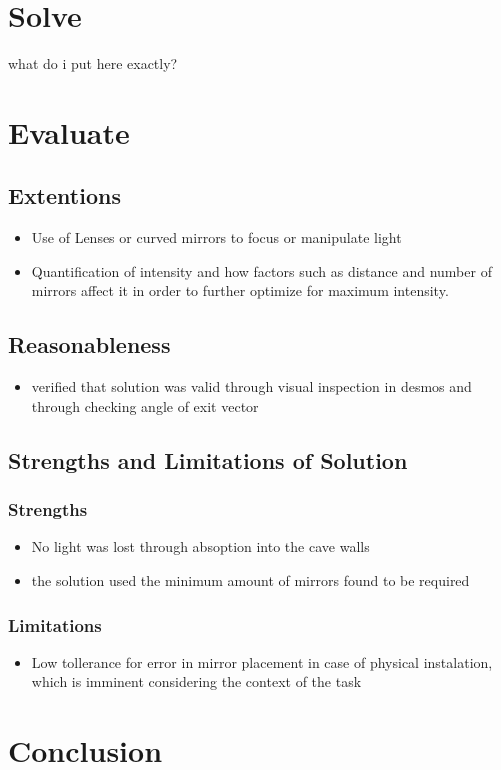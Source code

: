 \documentclass[11pt, letterpaper]{article}
\begin{document}
\par 


\section{Solve}

\par 
what do i put here exactly?

\section{Evaluate}



\subsection{Extentions}
\begin{itemize}
\item Use of Lenses	or curved mirrors to focus or manipulate light 
\item Quantification of intensity and how factors such as distance and number of mirrors affect it in order to further optimize for maximum intensity. 
	
\end{itemize}



\subsection{Reasonableness}
\begin{itemize}
\item verified that solution was valid through visual inspection in desmos and through checking angle of exit vector
\end{itemize}

\subsection{Strengths and Limitations of Solution}
\subsubsection{Strengths}
\begin{itemize}
\item No light was lost through absoption into the cave walls
\item the solution used the minimum amount of mirrors found to be required
\end{itemize}
\subsubsection{Limitations}
\begin{itemize}


\item Low tollerance for error in mirror placement in case of physical instalation, which is imminent considering the context of the task
\end{itemize}
\section{Conclusion}


 
\end{document}
